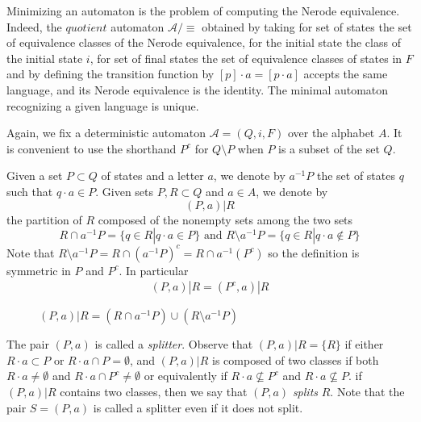 Minimizing an automaton is the problem of computing the Nerode equivalence. Indeed, the $quotient$ automaton $\mathcal{A}/\equiv$ obtained by taking for set of states the set of equivalence classes of the Nerode equivalence, for the initial state the class of the initial state $i$, for set of final states the set of equivalence classes of states in $F$ and by defining the transition function by $[p]\cdot a = [p\cdot a]$ accepts the same language, and its Nerode equivalence is the identity. The minimal automaton recognizing a given language is unique.

\begin{definition} 
	Again, we fix a deterministic automaton $\mathcal{A} = (Q, i, F)$ over
	the alphabet $A$. It is convenient to use the shorthand $P^c$ for $Q\setminus P$ when $P$ is a subset of the set $Q$.
	
	Given a set $P\subset Q$ of states and a letter $a$, we denote by $a^{-1}P$ the set of states $q$ such	that $q\cdot a\in P$.  Given sets $P,R\subset Q $ and $a\in A$, we denote by
	\[(P,a)|R\]
	the partition of $R$ composed of the nonempty sets among the two sets
	\[R\cap a^{-1}P=\{q\in R|q\cdot a\in P\} \text{ and } R\setminus a^{-1}P =\{q\in R|q\cdot a\notin P \} \]
	Note that $R\setminus a^{-1}P=R\cap(a^{-1}P)^c=R\cap a^{-1}(P^c)$ so the definition is symmetric in $P$ and $P^c$. In particular
	\begin{align}
	  (P,a)|R=(P^c,a)|R %
	\end{align}
	
\end{definition}

\begin{figure}[htbp]
    \hspace{2cm}
    \caption{$(P,a)|R=(R\cap a^{-1}P) \cup (R\setminus a^{-1}P)$}
\end{figure}

The pair $(P,a)$ is called a \textit{splitter}. Observe that $(P,a)|R=\{R\}$ if either $R\cdot a\subset P$ or $R\cdot a\cap P=\emptyset$, and $(P,a)|R$ is composed of two classes if both $R\cdot a\ne\emptyset$ and $R\cdot a\cap P^c\ne\emptyset$ or equivalently if $R\cdot a\nsubseteq P^c$ and $R\cdot a\nsubseteq P$. if $(P,a)|R$ contains two classes, then we say that $(P,a)$  \textit{splits} $R$. Note that the pair $S=(P,a)$ is called a splitter even if it does not split.

